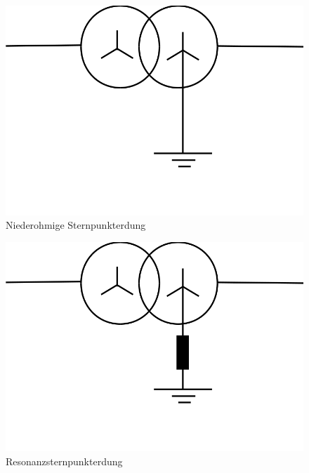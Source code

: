 \documentclass{scrartcl}
\begin{document}
\begin{onehalfspace}
	\begin{figure}[H]
	\centering
	\includegraphics[scale=0.3]{img/nospe.png}
	\caption{Niederohmige Sternpunkterdung}
	\label{nospe}
	\end{figure}
	
	\begin{figure}[H]
	\centering
	\includegraphics[scale=0.3]{img/respe.png}
	\caption{Resonanzsternpunkterdung}
	\label{respe}
	\end{figure}
	

\end{onehalfspace}
\end{document}
